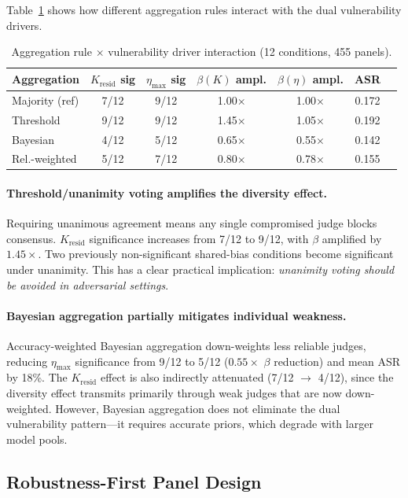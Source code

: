 \documentclass[11pt,a4paper]{article}
\newcommand{\etamax}{\eta_{\max}}
\newcommand{\kresid}{K_{\text{resid}}}
\begin{document}
Table~\ref{tab:aggregation} shows how different aggregation rules interact with the dual vulnerability drivers.

\begin{table}[t]
\centering
\caption{Aggregation rule $\times$ vulnerability driver interaction (12 conditions, 455 panels).}
\label{tab:aggregation}
\small
\begin{tabular}{@{}lcccccc@{}}
\toprule
Aggregation & $\kresid$ sig & $\etamax$ sig & $\beta(K)$ ampl. & $\beta(\eta)$ ampl. & ASR \\
\midrule
Majority (ref) & 7/12 & 9/12 & 1.00$\times$ & 1.00$\times$ & 0.172 \\
Threshold & 9/12 & 9/12 & 1.45$\times$ & 1.05$\times$ & 0.192 \\
Bayesian & 4/12 & 5/12 & 0.65$\times$ & 0.55$\times$ & 0.142 \\
Rel.-weighted & 5/12 & 7/12 & 0.80$\times$ & 0.78$\times$ & 0.155 \\
\bottomrule
\end{tabular}
\end{table}

\paragraph{Threshold/unanimity voting amplifies the diversity effect.} Requiring unanimous agreement means any single compromised judge blocks consensus. $\kresid$ significance increases from 7/12 to 9/12, with $\beta$ amplified by $1.45\times$. Two previously non-significant shared-bias conditions become significant under unanimity. This has a clear practical implication: \emph{unanimity voting should be avoided in adversarial settings}.

\paragraph{Bayesian aggregation partially mitigates individual weakness.} Accuracy-weighted Bayesian aggregation down-weights less reliable judges, reducing $\etamax$ significance from 9/12 to 5/12 ($0.55\times$ $\beta$ reduction) and mean ASR by 18\%. The $\kresid$ effect is also indirectly attenuated (7/12 $\to$ 4/12), since the diversity effect transmits primarily through weak judges that are now down-weighted. However, Bayesian aggregation does not eliminate the dual vulnerability pattern---it requires accurate priors, which degrade with larger model pools.

\subsection{Robustness-First Panel Design}
\end{document}
